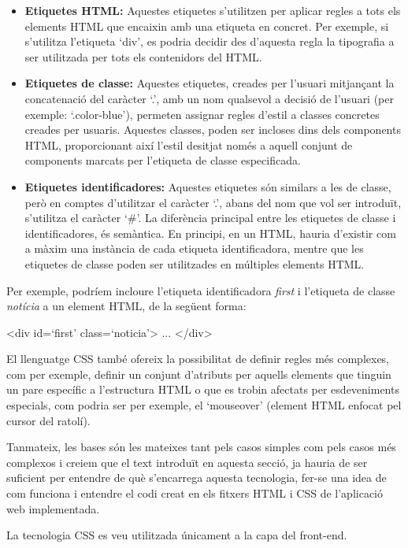     \begin{itemize}
        \item \textbf{Etiquetes HTML:}  Aquestes etiquetes s'utilitzen per aplicar regles a tots els elements HTML que encaixin amb una etiqueta en concret. Per exemple, si s'utilitza l'etiqueta `div', es podria decidir des d’aquesta regla la tipografia a ser utilitzada per tots els contenidors del HTML.
        \item \textbf{Etiquetes de classe:} Aquestes etiquetes, creades per l'usuari mitjançant la concatenació del caràcter `.', amb un nom qualsevol a decisió de l’usuari (per exemple: `.color-blue’), permeten assignar regles d'estil a classes concretes creades per usuaris. Aquestes classes, poden ser incloses dins dels components HTML, proporcionant així l'estil desitjat només a aquell conjunt de components marcats per l'etiqueta de classe especificada.
        \item \textbf{Etiquetes identificadores:} Aquestes etiquetes són similars a les de classe, però en comptes d'utilitzar el caràcter `.', abans del nom que vol ser introduït, s'utilitza el caràcter `\#'. La diferència principal entre les etiquetes de classe i identificadores, és semàntica. En principi, en un HTML, hauria d’existir com a màxim una instància de cada etiqueta identificadora, mentre que les etiquetes de classe poden ser utilitzades en múltiples elements HTML.
    \end{itemize}

    Per exemple, podríem incloure l’etiqueta identificadora \emph{first} i l’etiqueta de classe \emph{notícia} a un element HTML, de la següent forma:

    \begin{displayquote}
        <div id=`first’ class=`noticia’> ... </div>
    \end{displayquote}

    El llenguatge CSS també ofereix la possibilitat de definir regles més complexes, com per exemple, definir un conjunt d'atributs per aquells elements que tinguin un pare específic a l’estructura HTML o que es trobin afectats per esdeveniments especials, com podria ser per exemple, el `mouseover’ (element HTML enfocat pel cursor del ratolí).

    Tanmateix, les bases són les mateixes tant pels casos simples com pels casos més complexos i creiem que el text introduït en aquesta secció, ja hauria de ser suficient per entendre de què s’encarrega aquesta tecnologia, fer-se una idea de com funciona i entendre el codi creat en els fitxers HTML i CSS de l'aplicació web implementada.

    La tecnologia CSS es veu utilitzada únicament a la capa del front-end.

